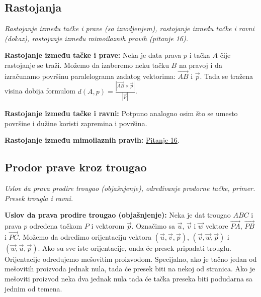 \documentclass[12pt]{article}
\newcommand{\vek}[1]{\overrightarrow{#1}}
\begin{document}
\subsection{Rastojanja}
\textit{Rastojanje između tačke i prave (sa izvodjenjem), rastojanje između
    tačke i ravni (dokaz), rastojanje između mimoilaznih pravih (pitanje 16).}
\par
\vspace*{1cm}

\textbf{Rastojanje između tačke i prave:} Neka je data prava $p$ i tačka $A$
čije rastojanje se traži. Možemo da izaberemo neku tačku $B$ na pravoj i da
izračunamo površinu paralelograma zadatog vektorima: $\vek{AB}$ i $\vek{p}$.
Tada se tražena visina dobija formulom
$d(A,p)=\frac{|\vek{AB}\times\vek{p}|}{|\vek{p}|}$.
\par
\textbf{Rastojanje između tačke i ravni:} Potpuno analogno osim što se umesto
površine i dužine koristi zapremina i površina.
\par

\textbf{Rastojanje između mimoilaznih pravih:}
\hyperref[subsec:pitanje_16]{Pitanje 16}.

\subsection{Prodor prave kroz trougao}
\textit{Uslov da prava prodire trougao (objašnjenje), određivanje prodorne
    tačke, primer. Presek trougla i ravni.}
\par
\vspace*{1cm}

\textbf{Uslov da prava prodire trougao (objašnjenje):} Neka je dat trougao
$ABC$ i prava $p$ određena tačkom $P$ i vektorom $\vek{p}$. Označimo sa
$\vek{u}$, $\vek{v}$ i $\vek{w}$ vektore $\vek{PA}$, $\vek{PB}$ i $\vek{PC}$.
Možemo da odredimo orijentaciju vektora $(\vek{u},\vek{v},\vek{p})$,
$(\vek{v},\vek{w},\vek{p})$ i $(\vek{w},\vek{u},\vek{p})$. Ako su sve iste
orijentacije, onda će presek pripadati trouglu. Orijentacije određujemo
mešovitim proizvodom. Specijalno, ako je tačno jedan od mešovitih proizvoda
jednak nula, tada će presek biti na nekoj od stranica. Ako je mešoviti proizvod
neka dva jednak nula tada će tačka preseka biti podudarna sa jednim od temena.
\par
\end{document}
